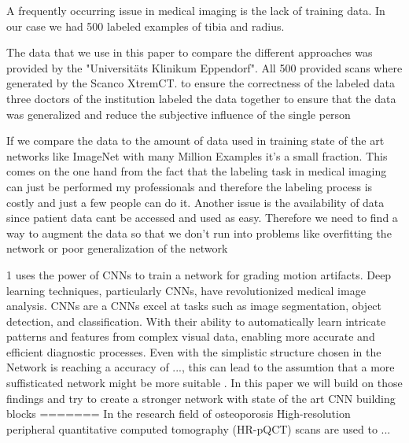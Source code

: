 \documentclass[
a4paper, 
12pt,
grayscalebody, %
abstract=on,
twoside, BCOR10mm, 12pt, DIV13,headinclude, footexclude, final, abstracton, openright
]{ibireprt}
\numberwithin{equation}{chapter}
\numberwithin{table}{chapter}
\numberwithin{figure}{chapter}
\numberwithin{algorithm}{chapter}
\numberwithin{example}{chapter}
\numberwithin{example}{chapter}
\begin{document}
A frequently occurring issue in medical imaging is the lack of training data. In our case we had 500 labeled examples of tibia and radius.

The data that we use in this paper to compare the different approaches was provided by the "Universitäts Klinikum Eppendorf". All 500 provided scans where generated by the Scanco XtremCT.%
to ensure the correctness of the labeled data three doctors of the institution labeled the data together to ensure that the data was generalized and reduce the subjective influence of the single person  

 If we compare the data to the amount of data used in training state of the art networks like ImageNet with many Million Examples it's a small fraction. This comes on the one hand from the fact that the labeling task in medical imaging can just be performed my professionals and therefore the labeling process is costly and just a few people can do it. Another issue is the availability of data since patient data cant be accessed and used as easy. Therefore we need to find a way to augment the data so that we don't run into problems like overfitting the network or poor generalization of the network 
  

1\cite{Sode2011} uses the power of CNNs to train a network for grading motion artifacts. Deep learning techniques, particularly CNNs, have revolutionized medical image analysis. CNNs are a %
CNNs excel at tasks such as image segmentation, object detection, and classification. With their ability to automatically learn intricate patterns and features from complex visual data, enabling more accurate and efficient diagnostic processes. %
Even with the simplistic structure chosen in \cite{Sode2011} the Network is reaching a accuracy of ..., this can lead to the assumtion that a more suffisticated network might be more suitable . In this paper we will build on those findings and try to create a stronger network with state of the art CNN building blocks 
=======
	In the research field of osteoporosis High-resolution peripheral quantitative computed tomography (HR-pQCT) scans are used to ...%
	
\end{document}
